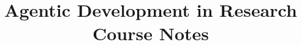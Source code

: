 \documentclass[12pt,openany]{book}
\begin{document}
\author{}
\title{
\Huge{Agentic Development in Research}\\[5mm]
\Large{Course Notes}}

\frontmatter
\maketitle

\tableofcontents



\mainmatter











\printindex
\end{document}
